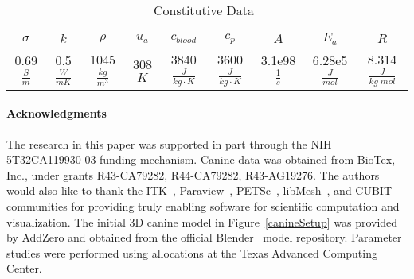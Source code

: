 \documentclass{article}
\begin{document}
\begin{table}[h]
\caption{Constitutive Data~\cite{Handbook05,stauffer2003paa,mcnichols2004mtb}}\label{modeldata}
\centering
\begin{tabular}{|c|c|c|c|c|c|c|c|c|} \hline
$\sigma$  &  $k$   &  $\rho$                &  $u_a$       &
$c_{blood}$                  &  $c_p$  & $A$ & $E_a$  & $R$  \\ \hline
 0.69 $\frac{S}{m}$  &  0.5  $\frac{W}{m K}$ &  1045 $\frac{kg}{m^3}$ &  308  $K$    &  3840 $ \frac{J}{kg \cdot K}$ &  3600 $ \frac{J}{kg \cdot K}$ 
  &  3.1e98 $ \frac{1}{s}$ &  6.28e5 $ \frac{J}{mol}$ &8.314 $\frac{J}{kg \; mol}$ \\ \hline
\end{tabular}
\end{table}


\paragraph{Acknowledgments}
The research in this paper was supported in part through the NIH
5T32CA119930-03 funding mechanism.  Canine data was obtained from
BioTex, Inc., under grants R43-CA79282, R44-CA79282, R43-AG19276.
The authors would also like to thank the
ITK~\cite{ITKSoftwareGuideSecondEdition}, Paraview~\cite{Paraview},
PETSc~\cite{petsc-manual}, libMesh~\cite{libMesh}, and
CUBIT~\cite{cubit} communities for providing truly enabling
software for scientific computation and visualization.  The initial
3D canine model in Figure~\ref{canineSetup} was provided by AddZero
and obtained from the official
Blender~\cite{roosendaal2000official} model repository.  Parameter
studies were performed using allocations  at the Texas Advanced
Computing Center. 
\end{document}
